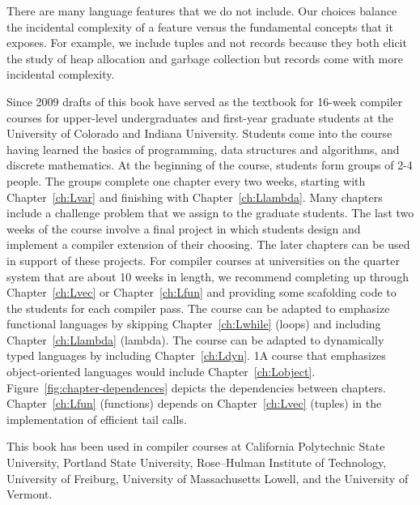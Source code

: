 \documentclass[7x10,nocrop]{TimesAPriori_MIT}%
\def\pythonEd{1}
\def\edition{1}
\newcommand{\python}[1]{{\if\edition\pythonEd #1\fi}}
\begin{document}
There are many language features that we do not include. Our choices
balance the incidental complexity of a feature versus the fundamental
concepts that it exposes. For example, we include tuples and not
records because they both elicit the study of heap allocation and
garbage collection but records come with more incidental complexity.

Since 2009 drafts of this book have served as the textbook for 16-week
compiler courses for upper-level undergraduates and first-year
graduate students at the University of Colorado and Indiana
University.
%
Students come into the course having learned the basics of
programming, data structures and algorithms, and discrete
mathematics.
%
At the beginning of the course, students form groups of 2-4 people.
The groups complete one chapter every two weeks, starting with
Chapter~\ref{ch:Lvar} and finishing with
Chapter~\ref{ch:Llambda}. Many chapters include a challenge problem
that we assign to the graduate students. The last two weeks of the
course involve a final project in which students design and implement
a compiler extension of their choosing.  The later chapters can be
used in support of these projects.  For compiler courses at
universities on the quarter system that are about 10 weeks in length,
we recommend completing up through Chapter~\ref{ch:Lvec} or
Chapter~\ref{ch:Lfun} and providing some scafolding code to the
students for each compiler pass.
%
The course can be adapted to emphasize functional languages by
skipping Chapter~\ref{ch:Lwhile} (loops) and including
Chapter~\ref{ch:Llambda} (lambda). The course can be adapted to
dynamically typed languages by including Chapter~\ref{ch:Ldyn}.
%
\python{A course that emphasizes object-oriented languages would
  include Chapter~\ref{ch:Lobject}.}
%
Figure~\ref{fig:chapter-dependences} depicts the dependencies between
chapters. Chapter~\ref{ch:Lfun} (functions) depends on
Chapter~\ref{ch:Lvec} (tuples) in the implementation of efficient
tail calls.

This book has been used in compiler courses at California Polytechnic
State University, Portland State University, Rose–Hulman Institute of
Technology, University of Freiburg, University of Massachusetts
Lowell, and the University of Vermont.
\end{document}
